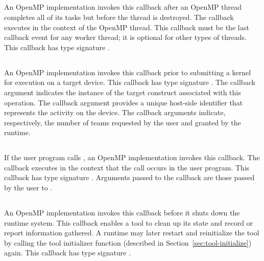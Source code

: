 \subsection{}
\label{sec:ompt_event_thread_end}
An OpenMP implementation invokes this callback
after an OpenMP thread completes all of
its tasks but before the thread is destroyed. The callback
executes in the context of the OpenMP thread. This callback must be the last callback event for any worker thread; it is optional for other types of threads.
This callback has type signature .

\subsection{}
\label{sec:ompt_event_target_submit}
An OpenMP implementation invokes this callback prior to submitting a kernel for execution on a target device.
This callback has type signature .
The callback argument  indicates the instance of the target construct associated with this operation.
The callback argument  provides a unique host-side identifier that represents the activity on the device.
The callback arguments    indicate, respectively, the number of teams requested by the user and granted by the runtime.

\subsection{}
\label{sec:ompt_event_tcontrol}
If the user program calls , an
OpenMP implementation invokes this callback.
The callback executes in the context that the call occurs in the user program.
This callback has type signature .
Arguments passed to the callback are those passed by the user to .

\subsection{}
\label{sec:ompt_event_runtime_shutdown}
An OpenMP implementation invokes this callback before it shuts down the
 runtime system.  This callback enables a tool to clean up its
 state and record or report information gathered. A runtime may later restart and reinitialize the tool by
calling the tool initializer
function (described in Section~\ref{sec:tool-initialize}) again.
 This callback has type signature .

